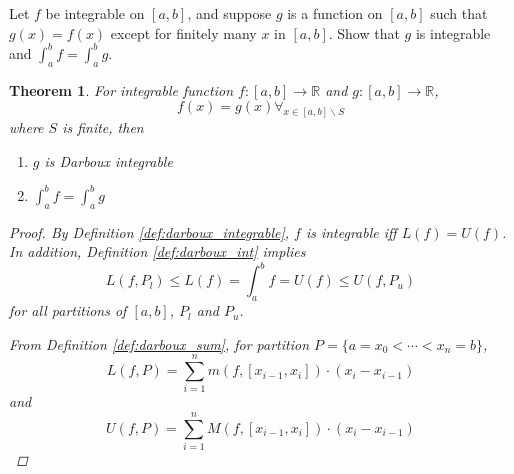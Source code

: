 \documentclass[]{article}
\newcommand{\R}{\mathbb{R}}
\newtheorem{theorem}{Theorem}
\begin{document}
\newpage
\section{}
Let $f$ be integrable on $[a,b]$, and suppose $g$ is a function on $[a,b]$ such that $g(x) = f(x)$ except for finitely many $x$ in $[a,b]$.
Show that $g$ is integrable and $\int_{a}^{b} f = \int_{a}^{b} g$.

\begin{theorem}
    For integrable function $f : [a,b] \to \R$ and $g : [a,b] \to \R$,\[
        f(x) = g(x) \forall_{x \in [a,b] \backslash S}
    \] where $S$ is finite, then 
    \begin{enumerate}
        \item $g$ is Darboux integrable
        \item $\int_{a}^{b} f = \int_{a}^{b} g$
    \end{enumerate} 
    \begin{proof}
        By Definition \ref{def:darboux_integrable}, $f$ is integrable iff $L(f) = U(f)$.
        In addition, Definition \ref{def:darboux_int} implies \[
            L(f,P_l) \leq L(f) = \int_{a}^{b} f = U(f) \leq U(f,P_u)
        \] for all partitions of $[a,b]$, $P_l$ and $P_u$.

        From Definition \ref{def:darboux_sum}, for partition $P = \{a = x_0 < \cdots < x_n = b\}$, \[
            L(f,P) = \sum_{i=1}^{n} m(f, [x_{i-1},x_{i}]) \cdot (x_{i} - x_{i-1})
        \] and \[
            U(f,P) = \sum_{i=1}^{n} M(f, [x_{i-1},x_{i}]) \cdot (x_{i} - x_{i-1})
        \]


\end{proof}
\end{theorem}
\end{document}
